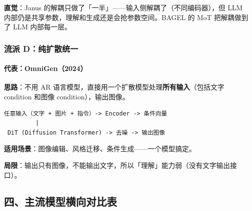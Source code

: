 \begin{intubox}
\textbf{直觉}：Janus 的解耦只做了「一半」——输入侧解耦了（不同编码器），但 LLM 内部仍是共享参数，理解和生成还是会抢参数空间。BAGEL 的 MoT 把解耦做到了 LLM 内部每一层。
\end{intubox}

\subsubsection{流派 D：纯扩散统一}

\paragraph{代表：OmniGen（2024）}

\textbf{思路}：不用 AR 语言模型，直接用一个扩散模型处理\textbf{所有输入}（包括文字 condition 和图像 condition），输出图像。

\begin{lstlisting}
任意输入（文字 + 图片 + 指令）-> Encoder -> 条件向量
         |
 DiT (Diffusion Transformer) -> 去噪 -> 输出图像
\end{lstlisting}

\textbf{适用场景}：图像编辑、风格迁移、条件生成——一个模型搞定。

\begin{warnbox}
\textbf{局限}：输出只有图像，不能输出文字，所以「理解」能力弱（没有文字输出接口）。
\end{warnbox}

\subsection{四、主流模型横向对比表}

